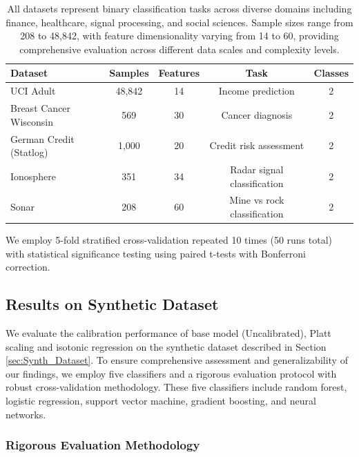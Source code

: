 \documentclass[12pt, a4paper]{article}
\begin{document}
\begin{table}[htbp]
    \centering
    \caption[Summary of Real-world Datasets]{Summary of Real-world Datasets Used for Calibration Evaluation}
    \label{tab:real_world_datasets}
    \begin{tabular}{lcccc}
        \toprule
        \textbf{Dataset} & \textbf{Samples} & \textbf{Features} & \textbf{Task} & \textbf{Classes} \\
        \midrule
        UCI Adult & 48,842 & 14 & Income prediction & 2 \\
        Breast Cancer Wisconsin & 569 & 30 & Cancer diagnosis & 2 \\
        German Credit (Statlog) & 1,000 & 20 & Credit risk assessment & 2 \\
        Ionosphere & 351 & 34 & Radar signal classification & 2 \\
        Sonar & 208 & 60 & Mine vs rock classification & 2 \\
        \bottomrule
    \end{tabular}
    \caption*{\small All datasets represent binary classification tasks across diverse domains including finance, healthcare, signal processing, and social sciences. Sample sizes range from 208 to 48,842, with feature dimensionality varying from 14 to 60, providing comprehensive evaluation across different data scales and complexity levels.}
\end{table}

We employ 5-fold stratified cross-validation repeated 10 times (50 runs total) with statistical significance testing using paired t-tests with Bonferroni correction. 

\subsection{Results on Synthetic Dataset} \label{sec:Results_Synth_Dataset}
We evaluate the calibration performance of  base model (Uncalibrated), Platt scaling and isotonic regression on the synthetic dataset described in Section \ref{sec:Synth_Dataset}. To ensure comprehensive assessment and generalizability of our findings, we employ five classifiers and a rigorous evaluation protocol with robust cross-validation methodology. These five classifiers include random forest, logistic regression, support vector machine, gradient boosting, and neural networks. 

\subsubsection{Rigorous Evaluation Methodology}
\end{document}
